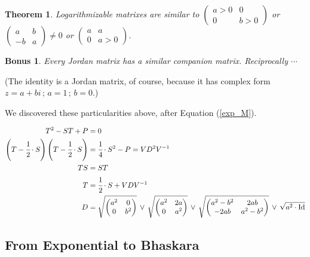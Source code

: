 \documentclass[12pt,a4paper]{article}
\newtheorem{thm}{Theorem}[section]
\newtheorem*{bonus}{Bonus}
\begin{document}
\begin{thm}
Logarithmizable matrixes are similar to $\left( \begin{matrix} a > 0 & 0 \\ 0 & b > 0 \end{matrix}\right)$ or $\left( \begin{matrix} a & b \\ -b & a \end{matrix}\right) \ne 0$ or $\left( \begin{matrix} a & a \\ 0 & a > 0 \end{matrix}\right)$.
\end{thm}

\begin{bonus}
Every Jordan matrix has a similar companion matrix. Reciprocally $\cdots$
\end{bonus}

(The identity is a Jordan matrix, of course, because it has complex form $z = a + bi\,;\,a = 1\,;\,b = 0$.)

We discovered these particularities above, after Equation ({\color{blue}\underline{\ref{exp_M}}}).

\begin{align}
  T^2 - ST + P &= 0 \\
  \left(T - \cfrac{1}{2}\cdot S \right)\left(T - \cfrac{1}{2}\cdot S \right) &= \cfrac{1}{4}\cdot S^2 - P = VD^2 V^{-1} \\
  TS &= ST \\
  T &= \cfrac{1}{2}\cdot S + VDV^{-1} \\
  D &= \sqrt{\left(\begin{matrix}a^2 & 0 \\ 0 & b^2 \end{matrix}\right)} \,\vee\,\sqrt{\left(\begin{matrix}a^2 & 2a \\ 0 & a^2 \end{matrix}\right)} \,\vee\,\sqrt{\left(\begin{matrix}a^2 - b^2 & 2ab \\ -2ab & a^2 - b^2 \end{matrix}\right)}\,\vee\,\sqrt{a^2\cdot \text{Id}}
\end{align}

\subsection{From Exponential to Bhaskara}
\end{document}

